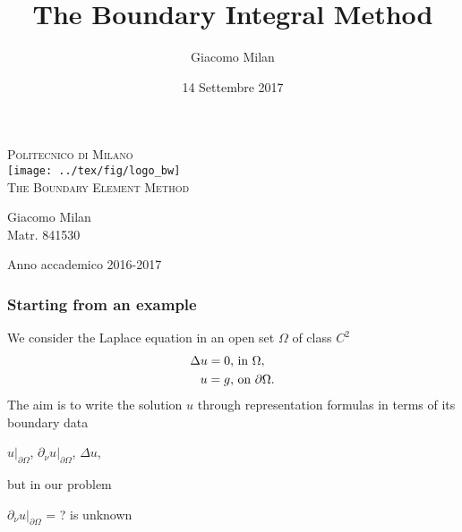 \documentclass[handout]{beamer}
\title{The Boundary Integral Method}
\author{Giacomo Milan}
\date{14 Settembre 2017}
\begin{document}
\begin{frame}
    \begin{center}
        \textsc{Politecnico di Milano}\\
        \vspace{1cm}
        \texttt{[image: ../tex/fig/logo\_bw]} \\
        \vspace{0.8cm}
        \Large
        \textsc{The Boundary Element Method}
        
        
        \begin{flushright}
        \small
        {Giacomo Milan\\ Matr. 841530}         
        \end{flushright}
        \normalsize
        \vfill
        Anno accademico 2016-2017
        
    \end{center}
\end{frame}
\begin{frame}
 \frametitle{Starting from an example}
We consider the Laplace equation in an open set $\Omega$ of class $C^2$
\begin{eqnarray}
 \Delta u = 0, & \textup{ in }\Omega,\label{eq:laplace-in}\\
 u = g, & \textup{ on }\partial\Omega.\label{eq:laplace-on}
\end{eqnarray}
\pause
The aim is to write the solution $u$ through {\color{blue}representation formulas}
in terms of its boundary data
\begin{center}
$u|_{\partial \Omega}$, $\partial_\nu u|_{\partial \Omega}$, $\Delta u$,
\end{center}
\pause
but in our problem
\begin{center}
 {\color{blue}$\partial_\nu u|_{\partial \Omega}$ = ?} is unknown
\end{center}

\end{frame}
\end{document}
